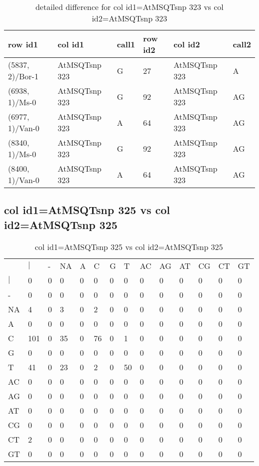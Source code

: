 \begin{center}
\begin{longtable}{|l|l|l|l|l|l|}
\caption{detailed difference for col id1=AtMSQTsnp 323 vs col id2=AtMSQTsnp 323} \label{table_dm853}\\
\hline
row id1&col id1&call1&row id2&col id2&call2\\
\hline
(5837, 2)/Bor-1&AtMSQTsnp 323&G&27&AtMSQTsnp 323&A\\
(6938, 1)/Ms-0&AtMSQTsnp 323&G&92&AtMSQTsnp 323&AG\\
(6977, 1)/Van-0&AtMSQTsnp 323&A&64&AtMSQTsnp 323&AG\\
(8340, 1)/Ms-0&AtMSQTsnp 323&G&92&AtMSQTsnp 323&AG\\
(8400, 1)/Van-0&AtMSQTsnp 323&A&64&AtMSQTsnp 323&AG\\
\hline
\end{longtable}
\end{center}

\subsection{col id1=AtMSQTsnp 325 vs col id2=AtMSQTsnp 325}
\begin{center}
\begin{longtable}{|l|l|l|l|l|l|l|l|l|l|l|l|l|l|}
\caption{col id1=AtMSQTsnp 325 vs col id2=AtMSQTsnp 325} \label{table_dm854}\\
\hline
\\
\hline
&$|$&-&NA&A&C&G&T&AC&AG&AT&CG&CT&GT\\
$|$&0&0&0&0&0&0&0&0&0&0&0&0&0\\
-&0&0&0&0&0&0&0&0&0&0&0&0&0\\
NA&4&0&3&0&2&0&0&0&0&0&0&0&0\\
A&0&0&0&0&0&0&0&0&0&0&0&0&0\\
C&101&0&35&0&76&0&1&0&0&0&0&0&0\\
G&0&0&0&0&0&0&0&0&0&0&0&0&0\\
T&41&0&23&0&2&0&50&0&0&0&0&0&0\\
AC&0&0&0&0&0&0&0&0&0&0&0&0&0\\
AG&0&0&0&0&0&0&0&0&0&0&0&0&0\\
AT&0&0&0&0&0&0&0&0&0&0&0&0&0\\
CG&0&0&0&0&0&0&0&0&0&0&0&0&0\\
CT&2&0&0&0&0&0&0&0&0&0&0&0&0\\
GT&0&0&0&0&0&0&0&0&0&0&0&0&0\\
\hline
\end{longtable}
\end{center}


